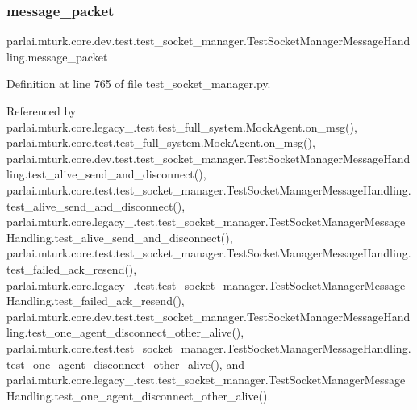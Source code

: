 \subsubsection{\texorpdfstring{message\+\_\+packet}{message\_packet}}
{\footnotesize\ttfamily parlai.\+mturk.\+core.\+dev.\+test.\+test\+\_\+socket\+\_\+manager.\+Test\+Socket\+Manager\+Message\+Handling.\+message\+\_\+packet}



Definition at line 765 of file test\+\_\+socket\+\_\+manager.\+py.



Referenced by parlai.\+mturk.\+core.\+legacy\+\_.\+test.\+test\+\_\+full\+\_\+system.\+Mock\+Agent.\+on\+\_\+msg(), parlai.\+mturk.\+core.\+test.\+test\+\_\+full\+\_\+system.\+Mock\+Agent.\+on\+\_\+msg(), parlai.\+mturk.\+core.\+dev.\+test.\+test\+\_\+socket\+\_\+manager.\+Test\+Socket\+Manager\+Message\+Handling.\+test\+\_\+alive\+\_\+send\+\_\+and\+\_\+disconnect(), parlai.\+mturk.\+core.\+test.\+test\+\_\+socket\+\_\+manager.\+Test\+Socket\+Manager\+Message\+Handling.\+test\+\_\+alive\+\_\+send\+\_\+and\+\_\+disconnect(), parlai.\+mturk.\+core.\+legacy\+\_.\+test.\+test\+\_\+socket\+\_\+manager.\+Test\+Socket\+Manager\+Message\+Handling.\+test\+\_\+alive\+\_\+send\+\_\+and\+\_\+disconnect(), parlai.\+mturk.\+core.\+test.\+test\+\_\+socket\+\_\+manager.\+Test\+Socket\+Manager\+Message\+Handling.\+test\+\_\+failed\+\_\+ack\+\_\+resend(), parlai.\+mturk.\+core.\+legacy\+\_.\+test.\+test\+\_\+socket\+\_\+manager.\+Test\+Socket\+Manager\+Message\+Handling.\+test\+\_\+failed\+\_\+ack\+\_\+resend(), parlai.\+mturk.\+core.\+dev.\+test.\+test\+\_\+socket\+\_\+manager.\+Test\+Socket\+Manager\+Message\+Handling.\+test\+\_\+one\+\_\+agent\+\_\+disconnect\+\_\+other\+\_\+alive(), parlai.\+mturk.\+core.\+test.\+test\+\_\+socket\+\_\+manager.\+Test\+Socket\+Manager\+Message\+Handling.\+test\+\_\+one\+\_\+agent\+\_\+disconnect\+\_\+other\+\_\+alive(), and parlai.\+mturk.\+core.\+legacy\+\_.\+test.\+test\+\_\+socket\+\_\+manager.\+Test\+Socket\+Manager\+Message\+Handling.\+test\+\_\+one\+\_\+agent\+\_\+disconnect\+\_\+other\+\_\+alive().

\mbox{\label{classparlai_1_1mturk_1_1core_1_1dev_1_1test_1_1test__socket__manager_1_1TestSocketManagerMessageHandling_a0580eca17e4f94732f6c2ef435c0b51f}} 
